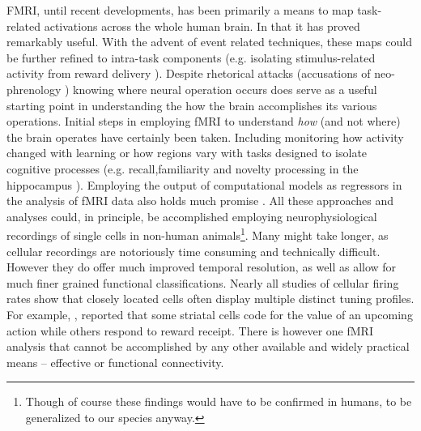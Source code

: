 \documentclass[doc]{apa}        %
\begin{document}
FMRI, until recent developments, has been primarily a means to map task-related activations across the whole human brain.  In that it has proved remarkably useful.  With the advent of event related techniques, these maps could be further refined to intra-task components (e.g. isolating stimulus-related activity from reward delivery \cite{Knutson:2001p5245}).  Despite rhetorical attacks (accusations of neo-phrenology \cite{Friston:2002p7254}) knowing where neural operation occurs does serve as a useful starting point in understanding the how the brain accomplishes its various operations.  Initial steps in employing fMRI to understand \emph{how} (and not where) the brain operates have certainly been taken.  Including monitoring how activity changed with learning \cite{Seger:2005pd} or how regions vary with tasks designed to isolate cognitive processes (e.g. recall,familiarity and novelty processing in the hippocampus \cite{Daselaar:2006p7256}).  Employing the output of computational models as regressors in the analysis of fMRI data also holds much promise \cite{ODoherty:2007p5537}. All these approaches and analyses could, in principle, be accomplished employing neurophysiological recordings of single cells in non-human animals\footnote{Though of course these findings would have to be confirmed in humans, to be generalized to our species anyway.}. Many might take longer, as cellular recordings are notoriously time consuming and technically difficult.  However they do offer much improved temporal resolution, as well as allow for much finer grained functional classifications.  Nearly all studies of cellular firing rates show that closely located cells often display multiple distinct tuning profiles.  For example, , reported that some striatal cells code for the value of an upcoming action while others respond to reward receipt.  There is however one fMRI analysis that cannot be accomplished by any other available and widely practical means  -- effective or functional connectivity.
\end{document}
